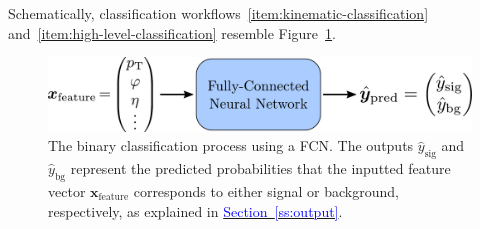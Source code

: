 \documentclass[11pt, a4paper]{article}
\newcommand{\myhref}[2]{\hyperref[#1]{\textcolor{blue}{#2}}}
\renewcommand{\vec}[1]{\bm{#1}}
\begin{document}
Schematically, classification workflows~\ref{item:kinematic-classification} and~\ref{item:high-level-classification} resemble Figure~\ref{fig:fcn-in-out}.
\begin{figure}[htb!]
    \centering
    \includegraphics[width=0.9\linewidth]{vector/fcn-in-out.pdf}
    \caption{The binary classification process using a FCN.
    The outputs $ \hat{y}_{\text{sig}} $ and $ \hat{y}_{\text{bg}} $ represent the predicted probabilities that the inputted feature vector $ \vec{x}_{\text{feature}} $ corresponds to either signal or background, respectively, as explained in \myhref{ss:output}{Section~\ref{ss:output}}.}
    \label{fig:fcn-in-out}
\end{figure}

\end{document}
